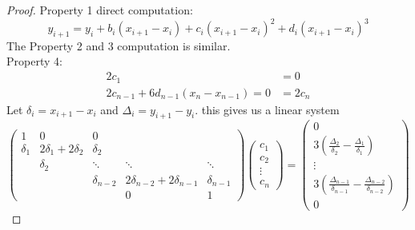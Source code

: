 \documentclass[11pt]{article}
\begin{document}
\begin{proof}
    Property 1 direct computation: \[
        y_{i+1} = y_i + b_i(x_{i+1} - x_i) + c_i(x_{i+1}-x_i)^2 + d_i(x_{i+1} - x_i)^3
    \]
    The Property 2 and 3 computation is similar.\\
    Property 4:
    \begin{align*}
        2c_1 &= 0\\
        2c_{n-1} +6 d_{n-1}(x_n - x_{n-1}) = 0 &= 2c_n
    \end{align*}
    Let $\delta_i = x_{i+1}-x_i$ and $\Delta_i = y_{i+1}-y_i$. this gives us a linear system
    \[
        \begin{pmatrix}
            1 & 0 & 0\\
            \delta_1 & 2\delta_1+2\delta_2 & \delta_2 \\
             & \delta_2 & \ddots & \ddots & \ddots\\
            & & \delta_{n-2} & 2\delta_{n-2}+2\delta_{n-1} & \delta_{n-1}\\
            & & & 0 & 1
        \end{pmatrix}
        \begin{pmatrix}
            c_1\\
            c_2\\
            \vdots \\
            c_n
        \end{pmatrix} = 
        \begin{pmatrix}
            0\\
            3(\frac{\Delta_2}{\delta_2} - \frac{\Delta_1}{\delta_1})\\
            \vdots\\
            3(\frac{\Delta_{n-1}}{\delta_{n-1}} - \frac{\Delta_{n-2}}{\delta_{n-2}})\\
            0
        \end{pmatrix}
    \]
\end{proof}
\end{document}
